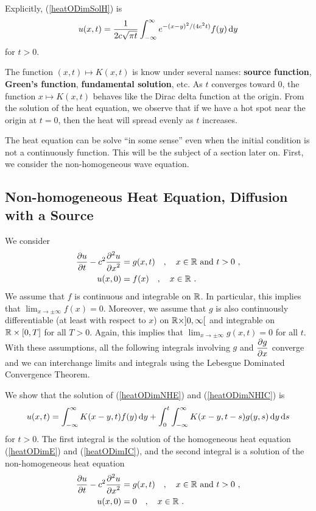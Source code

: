 Explicitly, (\ref{heatODimSolH}) is
\[
u(x,t) = \frac{1}{2c\sqrt{\pi t}} \int_{-\infty}^{\infty}
e^{-(x-y)^2/(4c^2t)} f(y) \,\mathrm{d}{y}
\]
for $t>0$.

The function $(x,t) \mapsto K(x,t)$ is know under several names:
{\bfseries source function},
{\bfseries Green's function},
{\bfseries fundamental solution}, etc.  As
$t$ converges toward $0$, the function $x \mapsto K(x,t)$ behaves like
the Dirac delta function at the origin.  From the solution of the heat
equation, we observe that if we have a hot spot near the origin at
$t=0$, then the heat will spread evenly as $t$ increases.

The heat equation can be solve ``in some sense'' even when the
initial condition is not a continuously function.  This
will be the subject of a section later on.  First, we consider the
non-homogeneous wave equation.

\subsection{Non-homogeneous Heat Equation, Diffusion with a Source}

We consider
\begin{align}
\frac{\partial{u}}{\partial t} - c^2 \frac{\displaystyle \partial^{2}{u}} {\displaystyle \partial x^{2}} &= g(x,t) \quad , \quad
x\in \mathbb{R} \ \text{and} \ t > 0 \ , \label{heatODimNHE} \\
u(x,0) &= f(x) \quad , \quad x \in \mathbb{R} \ . \label{heatODimNHIC}
\end{align}
We assume that $f$ is continuous and integrable on $\mathbb{R}$.  In
particular, this implies that $\displaystyle \lim_{x\to \pm \infty} f(x) = 0$.
Moreover, we assume that $g$ is also continuously differentiable (at
least with respect to $x$) on $\mathbb{R} \times ]0,\infty[$ and integrable on
$\mathbb{R} \times [0,T]$ for all $T>0$.
Again, this implies that $\displaystyle \lim_{x\to \pm \infty} g(x,t) = 0$
for all $t$.   With these assumptions, all the
following integrals involving $g$ and $\displaystyle \frac{\partial{g}}{\partial x}$
converge and we can interchange limits and integrals using the
Lebesgue Dominated Convergence Theorem.

We show that the solution of (\ref{heatODimNHE}) and
(\ref{heatODimNHIC}) is
\[
u(x,t) = \int_{-\infty}^{\infty} K(x-y,t) f(y) \,\mathrm{d}{y}
+ \int_0^t \int_{-\infty}^{\infty} K(x-y,t-s) g(y,s) \,\mathrm{d}{y}\,\mathrm{d}{s}
\]
for $t>0$.  The first integral is the solution of the homogeneous heat
equation (\ref{heatODimE}) and (\ref{heatODimIC}), and the second
integral is a solution of the non-homogeneous heat equation
\begin{align}
\frac{\partial{u}}{\partial t} - c^2 \frac{\displaystyle \partial^{2}{u}} {\displaystyle \partial x^{2}} &= g(x,t) \quad , \quad
x\in \mathbb{R} \ \text{and} \ t > 0 \ , \label{heatODimNHEG}\\
u(x,0) &= 0 \quad ,\quad x \in \mathbb{R} \ . \label{heatODimNHICG}
\end{align}

